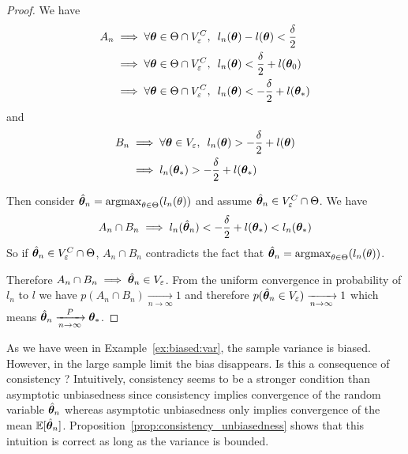\begin{proof}
  We have
  \begin{align}
        A_n &\implies \forall \boldsymbol{\theta} \in \Theta \cap V_{\varepsilon}^C,  \enspace l_n(\boldsymbol{\theta}) - l(\boldsymbol{\theta}) < \frac{\delta}{2} \\
        &\implies \forall \boldsymbol{\theta} \in \Theta \cap V_{\varepsilon}^C,  \enspace l_n(\boldsymbol{\theta}) < \frac{\delta}{2} + l(\boldsymbol{\theta}_0) \\
        &\implies \forall \boldsymbol{\theta} \in \Theta \cap V_{\varepsilon}^C,  \enspace l_n(\boldsymbol{\theta}) < -\frac{\delta}{2} + l(\boldsymbol{\theta}_*)
  \end{align}
  and 
  \begin{align}
    B_n &\implies \forall \boldsymbol{\theta} \in V_{\varepsilon}, \enspace l_n(\boldsymbol{\theta}) > -\frac{\delta}{2} + l(\boldsymbol{\theta}) \\
        &\implies l_n(\boldsymbol{\theta}_*) > -\frac{\delta}{2} + l(\boldsymbol{\theta}_*) \\
  \end{align}

  Then consider $\hat{\boldsymbol{\theta}}_n = \operatorname*{argmax}_{\theta \in
    \Theta}(l_n(\theta))$ and assume $\hat{\boldsymbol{\theta}}_n \in V_{\varepsilon}^C \cap \Theta$.
  We have
  \begin{align}
    A_n \cap B_n \implies l_n(\hat{\boldsymbol{\theta}}_n) < -\frac{\delta}{2} + l(\boldsymbol{\theta}_*) < l_n(\boldsymbol{\theta}_*)
  \end{align}
  So if $\hat{\boldsymbol{\theta}}_n \in V_{\varepsilon}^C \cap \Theta$, $A_n \cap B_n$ contradicts the fact that $\hat{\boldsymbol{\theta}}_n = \operatorname*{argmax}_{\theta \in
    \Theta}(l_n(\theta))$.

  Therefore $A_n \cap B_n \implies \hat{\boldsymbol{\theta}}_n \in V_{\varepsilon} $.
  From the uniform convergence in probability of $l_n$ to $l$ we have
  $p(A_n \cap B_n) \xrightarrow[n \rightarrow \infty]{} 1$ and therefore
  $p(\hat{\boldsymbol{\theta}}_n \in V_{\varepsilon}) \xrightarrow[n \rightarrow \infty]{} 1$ which
  means $\hat{\boldsymbol{\theta}}_n \xrightarrow[n \rightarrow \infty]{P} \boldsymbol{\theta}_*$.
\end{proof}

As we have ween in Example~\ref{ex:biased:var}, the sample variance is biased.
However, in the large sample limit the bias disappears. Is this a consequence of
consistency ? Intuitively, consistency  seems to be a stronger condition than asymptotic
unbiasedness since consistency implies convergence of the random variable
$\hat{\boldsymbol{\theta}}_n$ whereas asymptotic unbiasedness only implies convergence of the mean $\mathbb{E}[\hat{\boldsymbol{\theta}}_n]$.
Proposition~\ref{prop:consistency_unbiasedness} shows that this intuition is correct as long as the variance is bounded.

